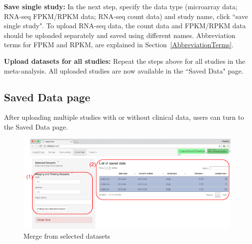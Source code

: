 \begin{steps}
\item \textbf{Save single study:}
In the next step,
specify the data type (microarray data; RNA-seq FPKM/RPKM data; RNA-seq count data) and study name,
click ``save single study".
To upload RNA-seq data, the count data and FPKM/RPKM
 data should be uploaded separately and saved using different names.
Abbreviation terms for FPKM and RPKM, are explained in Section~\ref{AbbreviationTerms}.

\item \textbf{Upload datasets for all studies:}
Repeat the steps above for all studies in the meta-analysis.
All uploaded studies are now available in the ``Saved Data" page. 
 
\end{steps}

\subsection{Saved Data page}
\label{sec:saved}

After uploading multiple studies with or without clinical data,
users can turn to the Saved Data page.

\begin{figure}[H]
\begin{center}
\includegraphics[scale=1]{./figure/preprocessing/GUImerge.pdf}
\caption{Merge from selected datasets}
\label{fig:GUImerge}
\end{center}
\end{figure}


